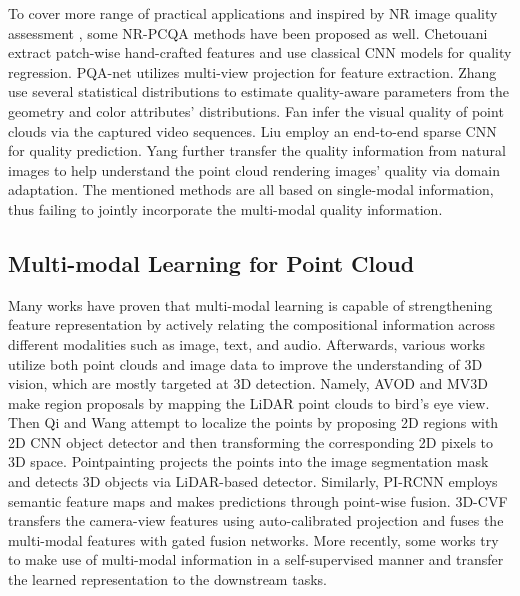 \documentclass{article}
\begin{document}
To cover more range of practical applications and inspired by NR image quality assessment \cite{zhang2022nor,zhang2022dual,zhang2021ano}, some NR-PCQA methods have been proposed as well.  Chetouani    \cite{chetouani2021deep} extract patch-wise hand-crafted features and use classical CNN models for quality regression. PQA-net \cite{liu2021pqa} utilizes multi-view projection for feature extraction. Zhang    \cite{zhang2021no} use several statistical distributions to estimate quality-aware parameters from the geometry and color attributes' distributions. Fan    \cite{fan2022no} infer the visual quality of point clouds via the captured video sequences. Liu    \cite{liu2022point} employ an end-to-end sparse CNN for quality prediction. Yang    \cite{yang2022no} further transfer the quality information from natural images to help understand the point cloud rendering images' quality via domain adaptation. The mentioned methods are all based on single-modal information, thus failing to jointly incorporate the multi-modal quality information.



\subsection{Multi-modal Learning for Point Cloud}
Many works \cite{radford2021learning,cheng2020look} have proven that multi-modal learning is capable of strengthening feature representation by actively relating the compositional information across different modalities such as image, text, and audio. Afterwards, various works utilize both point clouds and image data to improve the understanding of 3D vision, which are mostly targeted at 3D detection. Namely, AVOD \cite{ku2018joint} and MV3D \cite{chen2020object} make region proposals by mapping the LiDAR point clouds to bird's eye view. Then Qi    \cite{qi2018frustum} and Wang    \cite{wang2019frustum} attempt to localize the points by proposing 2D regions with 2D CNN object detector and then transforming the corresponding 2D pixels to 3D space.  Pointpainting \cite{vora2020pointpainting} projects the points into the image segmentation mask and detects 3D objects via LiDAR-based detector. Similarly, PI-RCNN \cite{xie2020pi} employs semantic feature maps and makes predictions through point-wise fusion. 3D-CVF  \cite{yoo20203d} transfers the camera-view features using auto-calibrated projection and fuses the multi-modal features with gated fusion networks. More recently, some works \cite{afham2022crosspoint,zhang2022cat} try to make use of multi-modal information in a self-supervised manner and transfer the learned representation to the downstream tasks.
\end{document}
